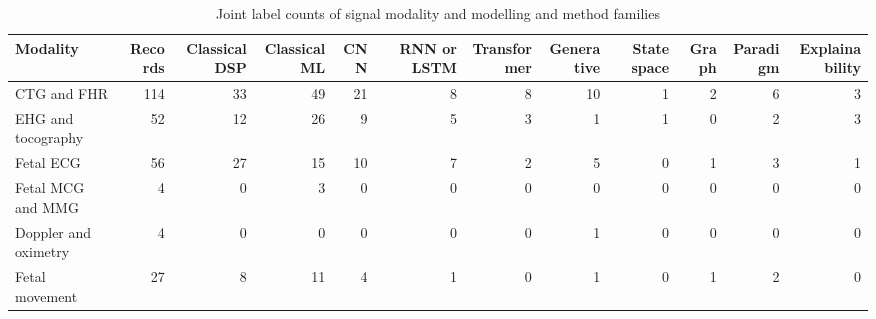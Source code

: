 \begin{table}[!t]
\caption{Joint label counts of signal modality and modelling and method families}
\label{tab:modality}
\centering
\footnotesize
\setlength{\tabcolsep}{2.8pt}
\begin{tabular}{@{}lrrrrrrrrrrr@{}}
\toprule
Modality & Records & Classical DSP & Classical ML & CNN & RNN or LSTM & Transformer & Generative & State space & Graph & Paradigm & Explainability \\
\midrule
CTG and FHR & 114 & 33 & 49 & 21 & 8 & 8 & 10 & 1 & 2 & 6 & 3 \\
EHG and tocography & 52 & 12 & 26 & 9 & 5 & 3 & 1 & 1 & 0 & 2 & 3 \\
Fetal ECG & 56 & 27 & 15 & 10 & 7 & 2 & 5 & 0 & 1 & 3 & 1 \\
Fetal MCG and MMG & 4 & 0 & 3 & 0 & 0 & 0 & 0 & 0 & 0 & 0 & 0 \\
Doppler and oximetry & 4 & 0 & 0 & 0 & 0 & 0 & 1 & 0 & 0 & 0 & 0 \\
Fetal movement & 27 & 8 & 11 & 4 & 1 & 0 & 1 & 0 & 1 & 2 & 0 \\
\bottomrule
\end{tabular}
\end{table}
